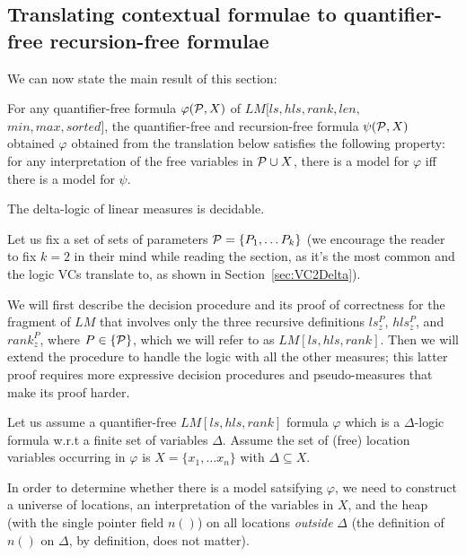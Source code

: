 \subsection{Translating contextual formulae to quantifier-free recursion-free formulae}
We can now state the main result of this section:

\begin{theorem}
\label{decidableLMbig}
	For any quantifier-free formula $\varphi({\cal P}, X)$ of $LM[ls, hls, rank, len, $\\$min, max, sorted]$, the quantifier-free and recursion-free
	formula $\psi({\cal P}, X)$ obtained $\varphi$ obtained from the translation below
	satisfies the following property: for any interpretation of the free variables
	in ${\cal P} \cup X$, there is a model for $\varphi$ iff there is a model for $\psi$.
\end{theorem}


\begin{corollary}
	The delta-logic of linear measures is decidable.
\end{corollary}

Let us fix a set of sets of parameters ${\cal P} = \{P_1, \ldots P_k\}$
(we encourage the reader to fix $k=2$ in their mind while reading the section, as it's the
most common and the logic VCs translate to, as shown in Section~\ref{sec:VC2Delta}).

We will first describe the decision procedure and its proof of correctness for the fragment
of $LM$ that involves only the three recursive definitions $ls_z^P$, $hls_z^P$, and $rank_z^P$,
where $P \in \{\cal P\}$, which we will refer to as $LM[ls,hls,rank]$. 
Then we will extend the procedure to handle the logic with all the other measures; this latter
proof requires more expressive decision procedures and pseudo-measures that make its proof harder.

Let us assume a quantifier-free $LM[ls,hls,rank]$ formula $\varphi$ which is a $\Delta$-logic formula
w.r.t a finite set of variables $\Delta$.
Assume the set of (free) location variables occurring in $\varphi$ is $X = \{x_1, \ldots x_n\}$ with
$\Delta \subseteq X$. 

In order to determine whether there is a model satsifying $\varphi$, we need to construct a universe
of locations, an interpretation of the variables in $X$, and the heap
(with the single pointer field $n()$) on all locations \emph{outside} $\Delta$ (the definition
of $n()$ on $\Delta$, by definition, does not matter).

